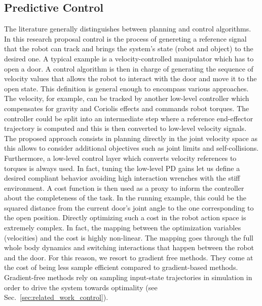 \subsection{Predictive Control}
The literature generally distinguishes between planning and control algorithms. In this research proposal control is the process of genereting a reference signal that the robot can track and brings the system's state (robot and object) to the desired one. A typical example is a velocity-controlled manipulator which has to open a door. A control algorithm is then in charge of generating the sequence of velocity values that allows the robot to interact with the door and move it to the open state. This definition is general enough to encompass various approaches. The velocity, for example, can be tracked by another low-level controller which compensates for gravity and Coriolis effects and commands robot torques. The controller could be split into an intermediate step where a reference end-effector trajectory is computed and this is then converted to low-level velocity signals. The proposed approach consists in planning directly in the joint velocity space as this allows to consider additional objectives such as joint limits and self-collisions. Furthermore, a low-level control layer which converts velocity references to torques is always used. In fact, tuning the low-level PD gains let us define a desired compliant behavior avoiding high interaction wrenches with the stiff environment. 
A cost function is then used as a proxy to inform the controller about the completeness of the task. In the running example, this could be the squared distance from the current door's joint angle to the one corresponding to the open position. 
Directly optimizing such a cost in the robot action space is extremely complex. In fact, the mapping between the optimization variables (velocities) and the cost is highly non-linear. The mapping goes through the full whole body dynamics and switching interactions that happen between the robot and the door. For this reason, we resort to gradient free methods. They come at the cost of being less sample efficient compared to gradient-based methods. Gradient-free methods rely on sampling input-state trajectories in simulation in order to drive the system towards optimality (see Sec.~\ref{sec:related_work_control}).

